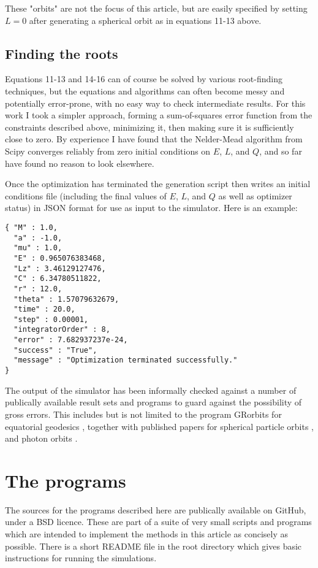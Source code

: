 \documentclass[11pt]{article}
\begin{document}
These "orbits" are not the focus of this article, but are easily specified by setting $L = 0$ after generating a spherical orbit as in equations 11-13 above.

\subsection{Finding the roots}

Equations 11-13 and 14-16 can of course be solved by various root-finding techniques, but the equations and algorithms can often become messy and potentially error-prone, with no easy way to check intermediate results.  For this work I took a simpler approach, forming a sum-of-squares error function from the constraints described above, minimizing it, then making sure it is sufficiently close to zero.  By experience I have found that the Nelder-Mead algorithm from Scipy converges reliably from zero initial conditions on $E$, $L$, and $Q$, and so far have found no reason to look elsewhere.

Once the optimization has terminated the generation script then writes an initial conditions file (including the final values of $E$, $L$, and $Q$ as well as optimizer status) in JSON format for use as input to the simulator.  Here is an example:

\begin{verbatim}
{ "M" : 1.0,
  "a" : -1.0,
  "mu" : 1.0,
  "E" : 0.965076383468,
  "Lz" : 3.46129127476,
  "C" : 6.34780511822,
  "r" : 12.0,
  "theta" : 1.57079632679,
  "time" : 20.0,
  "step" : 0.00001,
  "integratorOrder" : 8,
  "error" : 7.682937237e-24,
  "success" : "True",
  "message" : "Optimization terminated successfully."
}
\end{verbatim}

The output of the simulator has been informally checked against a number of publically available result sets and programs to guard against the possibility of gross errors.  This includes  but is not limited to the program GRorbits for equatorial geodesics \cite{grorbits}, together with published papers for spherical particle orbits \cite{teo}, and photon orbits \cite{kheng}.

\section{The programs}

The sources for the programs \cite{m4r35n357} described here are publically available on GitHub, under a BSD licence.  These are part of a suite of very small scripts and programs which are intended to implement the methods in this article as concisely as possible.  There is a short README file in the root directory which gives basic instructions for running the simulations.
\end{document}
